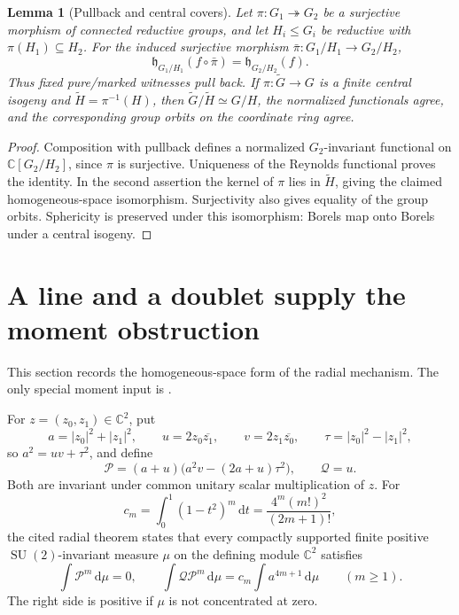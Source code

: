 \documentclass[11pt]{article}
\numberwithin{equation}{section}
\newtheorem{lemma}[theorem]{Lemma}
\theoremstyle{definition}
\theoremstyle{remark}
\newcommand{\C}{\mathbb C}
\newcommand{\dd}{\,\mathrm d}
\DeclareMathOperator{\SU}{SU}
\begin{document}
\begin{lemma}[Pullback and central covers]\label{lem:pullback}
Let $\pi:G_1\twoheadrightarrow G_2$ be a surjective morphism of connected reductive groups, and let $H_i\leq G_i$ be reductive with $\pi(H_1)\subseteq H_2$. For the induced surjective morphism $\bar\pi:G_1/H_1\to G_2/H_2$,
\[
 \mathfrak h_{G_1/H_1}(f\circ\bar\pi)=\mathfrak h_{G_2/H_2}(f).
\]
Thus fixed pure/marked witnesses pull back. If $\pi:\widetilde G\to G$ is a finite central isogeny and $\widetilde H=\pi^{-1}(H)$, then $\widetilde G/\widetilde H\simeq G/H$, the normalized functionals agree, and the corresponding group orbits on the coordinate ring agree.
\end{lemma}
\begin{proof}
Composition with pullback defines a normalized $G_2$-invariant functional on $\C[G_2/H_2]$, since $\pi$ is surjective. Uniqueness of the Reynolds functional proves the identity. In the second assertion the kernel of $\pi$ lies in $\widetilde H$, giving the claimed homogeneous-space isomorphism. Surjectivity also gives equality of the group orbits. Sphericity is preserved under this isomorphism: Borels map onto Borels under a central isogeny.
\end{proof}

\section{A line and a doublet supply the moment obstruction}\label{sec:line}
This section records the homogeneous-space form of the radial mechanism. The only special moment input is \cite[Theorem~4.1]{Long}.

For $z=(z_0,z_1)\in\C^2$, put
\begin{equation}\label{eq:hopf}
 a=|z_0|^2+|z_1|^2,\qquad
 u=2z_0\overline{z_1},\qquad
 v=2z_1\overline{z_0},\qquad
 \tau=|z_0|^2-|z_1|^2,
\end{equation}
so $a^2=uv+\tau^2$, and define
\begin{equation}\label{eq:radialpair}
 \mathscr P=(a+u)\bigl(a^2v-(2a+u)\tau^2\bigr),\qquad
 \mathscr Q=u.
\end{equation}
Both are invariant under common unitary scalar multiplication of $z$. For
\begin{equation}\label{eq:cm}
 c_m=\int_0^1(1-t^2)^m\dd t=\frac{4^m(m!)^2}{(2m+1)!},
\end{equation}
the cited radial theorem states that every compactly supported finite positive $\SU(2)$-invariant measure $\mu$ on the defining module $\C^2$ satisfies
\begin{equation}\label{eq:radial}
 \int\mathscr P^m\dd\mu=0,\qquad
 \int\mathscr Q\mathscr P^m\dd\mu
 =c_m\int a^{4m+1}\dd\mu\qquad(m\geq1).
\end{equation}
The right side is positive if $\mu$ is not concentrated at zero.
\end{document}
